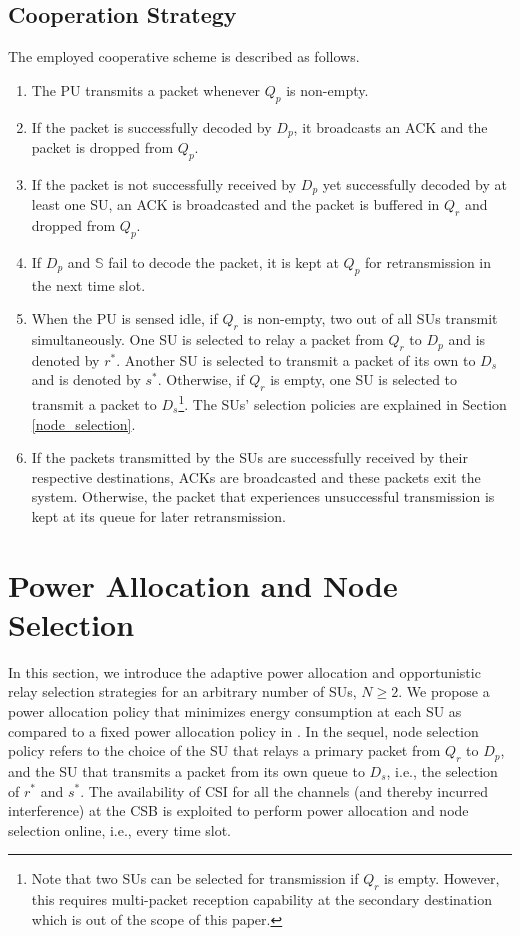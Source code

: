 \documentclass[journal,twocolumn]{IEEEtran}
\begin{document}
\subsection{Cooperation Strategy}\label{cooperation strategy}
The employed cooperative scheme is described as follows.
\begin{enumerate}
\item The PU transmits a packet whenever $Q_{p}$ is non-empty.

\item If the packet is successfully decoded by $D_{p}$, it broadcasts an ACK and the packet is dropped from $Q_{p}$.

\item If the packet is not successfully received by $D_{p}$ yet successfully decoded by at least one SU, an ACK is broadcasted and the packet is buffered in $Q_{r}$ and dropped from $Q_{p}$.

\item If $D_{p}$ and $\mathbb{S}$ fail to decode the packet, it is kept at $Q_{p}$ for retransmission in the next time slot.

\item When the PU is sensed idle, if $Q_{r}$ is non-empty, two out of all SUs transmit simultaneously. One SU is selected to relay a packet from $Q_{r}$ to $D_{p}$ and is denoted by $r^{*}$. Another SU is selected to transmit a packet of its own to $D_{s}$ and is denoted by $s^{*}$. Otherwise, if $Q_{r}$ is empty, one SU is selected to transmit a packet to $D_{s}$\footnote{Note that two SUs can be selected for transmission if $Q_r$ is empty. However, this requires multi-packet reception capability at the secondary destination which is out of the scope of this paper.}. The SUs' selection policies are explained in Section \ref{node_selection}.  

\item If the packets transmitted by the SUs are successfully received by their respective destinations, ACKs are broadcasted and these packets
    exit the system. Otherwise, the packet that experiences unsuccessful transmission is kept at its queue for later retransmission.

\end{enumerate}


\section{Power Allocation and Node Selection}\label{CS_PA}
In this section, we introduce the adaptive power allocation and opportunistic relay selection strategies for an arbitrary number of SUs, $N \geq 2$. We propose a power allocation policy
that minimizes energy consumption at each SU as compared to a fixed power allocation policy in \cite{Krikidis}.
In the sequel, node selection policy refers to the choice of the SU that relays a primary packet from $Q_{r}$ to $D_{p}$, and the SU that transmits a packet from its own queue to $D_{s}$, i.e., the selection of $r^*$ and $s^*$. The availability of CSI for all the channels (and thereby incurred interference) at the CSB is exploited to perform power allocation and node selection online, i.e., every time slot.
\end{document}
